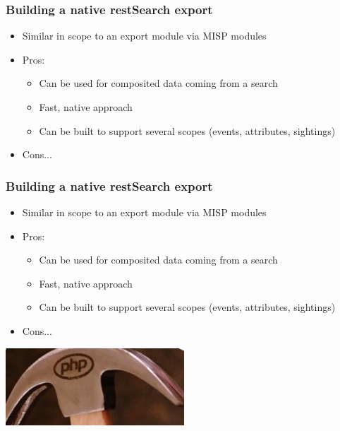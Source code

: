 
\begin{frame}
\titlepage
\end{frame}

\begin{frame}
  \frametitle{Building a native restSearch export}
  \begin{itemize}
    \item Similar in scope to an export module via MISP modules
    \item Pros:
    \begin{itemize}
      \item Can be used for composited data coming from a search
      \item Fast, native approach
      \item Can be built to support several scopes (events, attributes, sightings)
    \end{itemize}
    \item Cons...
  \end{itemize}
\end{frame}

\begin{frame}
  \frametitle{Building a native restSearch export}
  \begin{itemize}
    \item Similar in scope to an export module via MISP modules
    \item Pros:
    \begin{itemize}
      \item Can be used for composited data coming from a search
      \item Fast, native approach
      \item Can be built to support several scopes (events, attributes, sightings)
    \end{itemize}
    \item Cons...
  \end{itemize}
  \begin{center}
    \includegraphics[scale=0.5]{lolphp.jpg}
  \end{center}
\end{frame}


